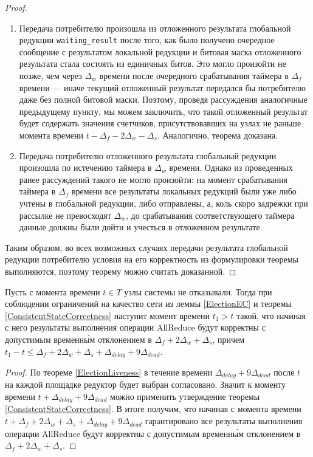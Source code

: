 \begin{proof}
\begin{enumerate}
        \item Передача потребителю произошла из отложенного результата глобальной редукции \texttt{waiting\_result} после того, как было получено очередное сообщение с результатом локальной редукции и битовая маска отложенного результата стала состоять из единичных битов. Это могло произойти не позже, чем через $\Delta_w$ времени после очередного срабатывания таймера в $\Delta_f$ времени --- иначе текущий отложенный результат передался бы потребителю даже без полной битовой маски. Поэтому, проведя рассуждения аналогичные предыдущему пункту, мы можем заключить, что такой отложенный результат будет содержать значения счетчиков, присутствовавших на узлах не раньше момента времени $t - \Delta_f - 2\Delta_w - \Delta_s$. Аналогично, теорема доказана.
        
        \item Передача потребителю отложенного результата глобальный редукции произошла по истечению таймера в $\Delta_w$ времени. Однако из проведенных ранее рассуждений такого не могло произойти: на момент срабатывания таймера в $\Delta_f$ времени все результаты локальных редукций были уже либо учтены в глобальной редукции, либо отправлены, а, коль скоро задрежки при рассылке не превосходят $\Delta_w$, до срабатывания соответствующего таймера данные должны были дойти и учесться в отложенном результате.
    \end{enumerate}
    
    Таким образом, во всех возможных случаях передачи результата глобальной редукции потребителю условия на его корректность из формулировки теоремы выполняются, поэтому теорему можно считать доказанной.
\end{proof}

\begin{consequence}
    Пусть с момента времени $t \in T$ узлы системы не отказывали. Тогда при соблюдении ограничений на качество сети из леммы \ref{ElectionEC} и теоремы \ref{ConsistentStateCorrectness} наступит момент времени $t_1 > t$ такой, что начиная с него результаты выполнения операции AllReduce будут корректны с допустимым временн\'{ы}м отклонением в $\Delta_f + 2\Delta_w + \Delta_s$, причем $t_1 - t \leq \Delta_f + 2\Delta_w + \Delta_s + \Delta_{delay} + 9\Delta_{dead}$.
\end{consequence}
\begin{proof}
    По теореме \ref{ElectionLiveness} в течение времени $\Delta_{delay} + 9\Delta_{dead}$ после $t$ на каждой площадке редуктор будет выбран согласовано. Значит к моменту времени $t + \Delta_{delay} + 9\Delta_{dead}$ можно применить утверждение теоремы \ref{ConsistentStateCorrectness}. В итоге получим, что начиная с момента времени $t + \Delta_f + 2\Delta_w + \Delta_s + \Delta_{delay} + 9\Delta_{dead}$ гарантировано все результаты выполнения операции AllReduce будут корректны с допустимым временн\'{ы}м отклонением в $\Delta_f + 2\Delta_w + \Delta_s$.
\end{proof}

